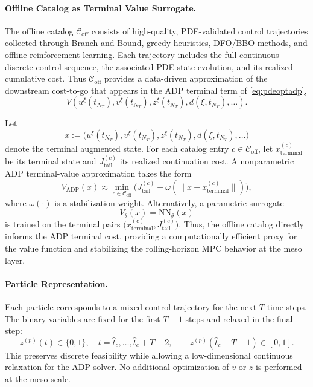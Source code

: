 \documentclass{article}
\newcommand{\1}{\mathds{1}}          %
\theoremstyle{definition}
\begin{document}
\begin{sloppypar}
\paragraph{Offline Catalog as Terminal Value Surrogate.}
The offline catalog $\mathcal{C}_{\mathrm{off}}$ consists of high-quality, 
PDE-validated control trajectories collected through Branch-and-Bound, greedy 
heuristics, DFO/BBO methods, and offline reinforcement learning.  
Each trajectory includes the full continuous-discrete control sequence, the 
associated PDE state evolution, and its realized cumulative cost.  
Thus $\mathcal{C}_{\mathrm{off}}$ provides a data-driven approximation of the
downstream cost-to-go that appears in the ADP terminal term of
\eqref{eq:pdeoptadp},
\[
V\!\left(u^{\xi}(t_{N_T}), v^{\xi}(t_{N_T}), z^{\xi}(t_{N_T}),
         d(\xi,t_{N_T}), \ldots\right).
\]

Let 
\[
x := \big(u^{\xi}(t_{N_T}), v^{\xi}(t_{N_T}), z^{\xi}(t_{N_T}),
         d(\xi,t_{N_T}),\ldots\big)
\]
denote the terminal augmented state.  
For each catalog entry $c\in\mathcal{C}_{\mathrm{off}}$, let 
$x^{(c)}_{\mathrm{terminal}}$ be its terminal state and 
$J^{(c)}_{\mathrm{tail}}$ its realized continuation cost.  
A nonparametric ADP terminal-value approximation takes the form
\[
V_{\mathrm{ADP}}(x)
\approx 
\min_{c\in\mathcal{C}_{\mathrm{off}}}
\Big(J^{(c)}_{\mathrm{tail}}
     +\omega(\|x-x^{(c)}_{\mathrm{terminal}}\|)\Big),
\]
where $\omega(\cdot)$ is a stabilization weight.  
Alternatively, a parametric surrogate
\[
V_{\theta}(x)=\mathrm{NN}_{\theta}(x)
\]
is trained on the terminal pairs 
$\big(x^{(c)}_{\mathrm{terminal}}, J^{(c)}_{\mathrm{tail}}\big)$.  
Thus, the offline catalog directly informs the ADP terminal cost, providing a 
computationally efficient proxy for the value function and stabilizing the 
rolling-horizon MPC behavior at the meso layer.

\paragraph{Particle Representation.}
Each particle corresponds to a mixed control trajectory for the next $T$ time 
steps.  The binary variables are fixed for the first $T-1$ steps and relaxed in the 
final step:
\[
z^{(p)}(t)\in\{0,1\},\quad t=\hat t_c,\ldots,\hat t_c+T-2,
\qquad 
z^{(p)}(\hat t_c+T-1)\in[0,1].
\]
This preserves discrete feasibility while allowing a low-dimensional continuous 
relaxation for the ADP solver.  
No additional optimization of $v$ or $z$ is performed at the meso scale.


\end{sloppypar}
\end{document}
